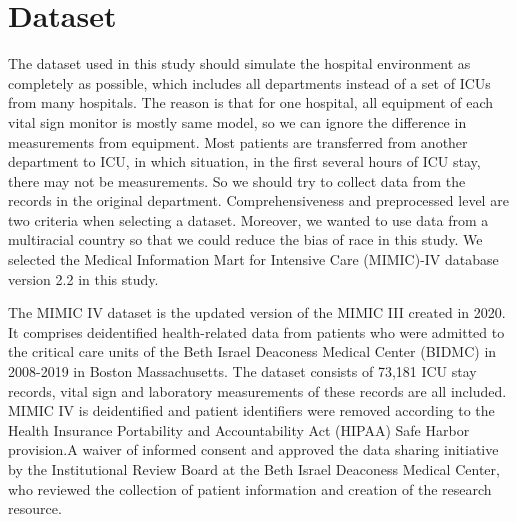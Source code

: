 \documentclass[12pt,a4paper,english
]{tunithesis}
\begin{document}
\section{Dataset}
The dataset used in this study should simulate the hospital environment as completely as possible, which includes all departments instead of a set of ICUs from many hospitals. The reason is that for one hospital, all equipment of each vital sign monitor is mostly same model, so we can ignore the difference in measurements from equipment. Most patients are transferred from another department to ICU, in which situation, in the first several hours of ICU stay, there may not be measurements. So we should try to collect data from the records in the original department. Comprehensiveness and preprocessed level are two criteria when selecting a dataset. Moreover, we wanted to use data from a multiracial country so that we could reduce the bias of race in this study. We selected the Medical Information Mart for Intensive Care (MIMIC)-IV database version 2.2 \textcite{johnson2023} in this study. 

The MIMIC IV dataset is the updated version of the MIMIC III created in 2020. It comprises deidentified health-related data from patients who were admitted to the critical care units of the Beth Israel Deaconess Medical Center (BIDMC) in 2008-2019 in Boston Massachusetts. The dataset consists of 73,181 ICU stay records, vital sign and laboratory measurements of these records are all included. MIMIC IV is deidentified and patient identifiers were removed according to the Health Insurance Portability and Accountability Act (HIPAA) Safe Harbor provision.A waiver of informed consent and approved the data sharing initiative by the Institutional Review Board at the Beth Israel Deaconess Medical Center, who reviewed the collection of patient information and creation of the research resource. \parencite{johnson2023}
\end{document}
